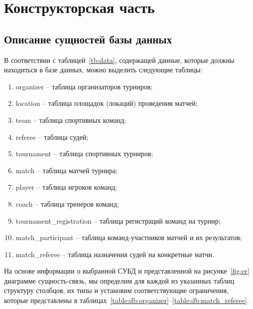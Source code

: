 \chapter{Конструкторская часть}

\section{Описание сущностей базы данных}

\renewcommand{\arraystretch}{1.3}

В соответствии с таблицей~\ref{tb:data}, содержащей данные, которые должны находиться в базе данных, можно выделить следующие таблицы:
\begin{enumerate}
	\item organizer -- таблица организаторов турниров;
	\item location -- таблица площадок (локаций) проведения матчей;
	\item team -- таблица спортивных команд;
	\item referee -- таблица судей;
	\item tournament -- таблица спортивных турниров;
	\item match -- таблица матчей турнира;
	\item player -- таблица игроков команд;
	\item coach -- таблица тренеров команд;
	\item tournament\_registration -- таблица регистраций команд на турнир;
	\item match\_participant -- таблица команд-участников матчей и их результатов;
	\item match\_referee -- таблица назначения судей на конкретные матчи.
\end{enumerate}

На основе информации о выбранной СУБД и представленной на рисунке~\ref{fig:er} диаграмме сущность-связь, мы определим для каждой из указанных таблиц структуру столбцов, их типы и установим соответствующие ограничения, которые представлены в таблицах~\ref{table:db:organizer}--\ref{table:db:match_referee}.

